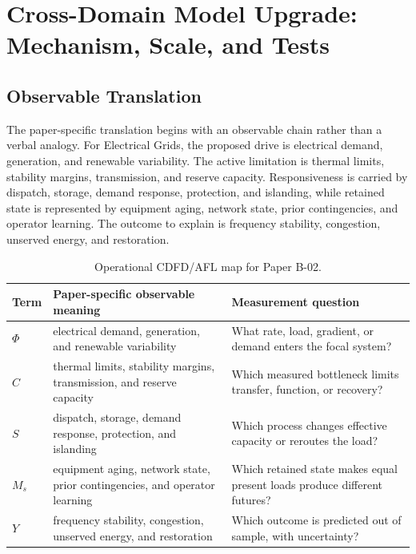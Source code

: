 \documentclass[11pt,a4paper]{article}
\begin{document}
\section{Cross-Domain Model Upgrade: Mechanism, Scale, and Tests}

\subsection{Observable Translation}

The paper-specific translation begins with an observable chain rather than a
verbal analogy. For Electrical Grids, the proposed drive is electrical demand, generation, and renewable variability.
The active limitation is thermal limits, stability margins, transmission, and reserve capacity. Responsiveness is carried by
dispatch, storage, demand response, protection, and islanding, while retained state is represented by
equipment aging, network state, prior contingencies, and operator learning. The outcome to explain is frequency stability, congestion, unserved energy, and restoration.

\begin{table}[htbp]
\centering
\small
\caption{Operational CDFD/AFL map for Paper B-02.}
\begin{tabularx}{\textwidth}{|l|X|X|}
\hline
\textbf{Term} & \textbf{Paper-specific observable meaning} & \textbf{Measurement question} \\
\hline
$\Phi$ & electrical demand, generation, and renewable variability & What rate, load, gradient, or demand enters the focal system? \\
\hline
$C$ & thermal limits, stability margins, transmission, and reserve capacity & Which measured bottleneck limits transfer, function, or recovery? \\
\hline
$S$ & dispatch, storage, demand response, protection, and islanding & Which process changes effective capacity or reroutes the load? \\
\hline
$M_s$ & equipment aging, network state, prior contingencies, and operator learning & Which retained state makes equal present loads produce different futures? \\
\hline
$Y$ & frequency stability, congestion, unserved energy, and restoration & Which outcome is predicted out of sample, with uncertainty? \\
\hline
\end{tabularx}
\end{table}
\end{document}
